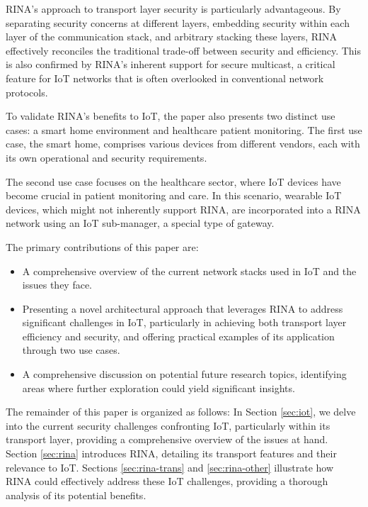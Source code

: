 \documentclass{ieeeaccess}
\begin{document}
RINA's approach to transport layer security is particularly advantageous. By separating security concerns at different layers, embedding security within each layer of the communication stack, and arbitrary stacking these layers, RINA effectively reconciles the traditional trade-off between security and efficiency. This is also confirmed by RINA's inherent support for secure multicast, a critical feature for IoT networks that is often overlooked in conventional network protocols.

To validate RINA's benefits to IoT, the paper also presents two distinct use cases: a smart home environment and healthcare patient monitoring. The first use case, the smart home, comprises various devices from different vendors, each with its own operational and security requirements. 

The second use case focuses on the healthcare sector, where IoT devices have become crucial in patient monitoring and care. In this scenario, wearable IoT devices, which might not inherently support RINA, are incorporated into a RINA network using an IoT sub-manager, a special type of gateway. 

The primary contributions of this paper are:
\begin{itemize}
	\item A comprehensive overview of the current network stacks used in IoT and the issues they face.
	\item Presenting a novel architectural approach that leverages RINA to address significant challenges in IoT, particularly in achieving both transport layer efficiency and security, and offering practical examples of its application through two use cases.
	\item A comprehensive discussion on potential future research topics, identifying areas where further exploration could yield significant insights.
\end{itemize}




The remainder of this paper is organized as follows: 
In Section \ref{sec:iot}, we delve into the current security challenges confronting IoT, particularly within its transport layer, providing a comprehensive overview of the issues at hand. Section \ref{sec:rina} introduces RINA, detailing its transport features and their relevance to IoT. Sections \ref{sec:rina-trans} and \ref{sec:rina-other} illustrate how RINA could effectively address these IoT challenges, providing a thorough analysis of its potential benefits. 
\end{document}

